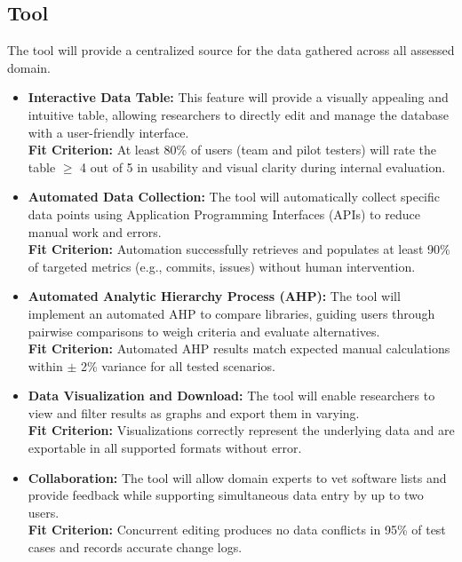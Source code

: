 \documentclass{article}
\begin{document}
\subsection{Tool}
The tool will provide a centralized source for the data gathered across all assessed domain.
\begin{itemize}
    \item \textbf{Interactive Data Table:} This feature will provide a visually appealing and intuitive table, allowing researchers to directly edit and manage the database with a user-friendly interface.
    \\\textbf{Fit Criterion:} At least 80\% of users (team and pilot testers) will rate the table $\geq$ 4 out of 5 in usability and visual clarity during internal evaluation.
    \item \textbf{Automated Data Collection:} The tool will automatically collect specific data points using Application Programming Interfaces (APIs) to reduce manual work and errors.
    \\\textbf{Fit Criterion:} Automation successfully retrieves and populates at least 90\% of targeted metrics (e.g., commits, issues) without human intervention.
    \item \textbf{Automated Analytic Hierarchy Process (AHP):} The tool will implement an automated AHP to compare libraries, guiding users through pairwise comparisons to weigh criteria and evaluate alternatives.
    \\\textbf{Fit Criterion:} Automated AHP results match expected manual calculations within $\pm$ 2\% variance for all tested scenarios.
    \item \textbf{Data Visualization and Download:} The tool will enable researchers to view and filter results as graphs and export them in varying.
    \\\textbf{Fit Criterion:} Visualizations correctly represent the underlying data and are exportable in all supported formats without error.
    \item \textbf{Collaboration:} The tool will allow domain experts to vet software lists and provide feedback while supporting simultaneous data entry by up to two users.
    \\\textbf{Fit Criterion:} Concurrent editing produces no data conflicts in 95\% of test cases and records accurate change logs.
\end{itemize}
\end{document}
